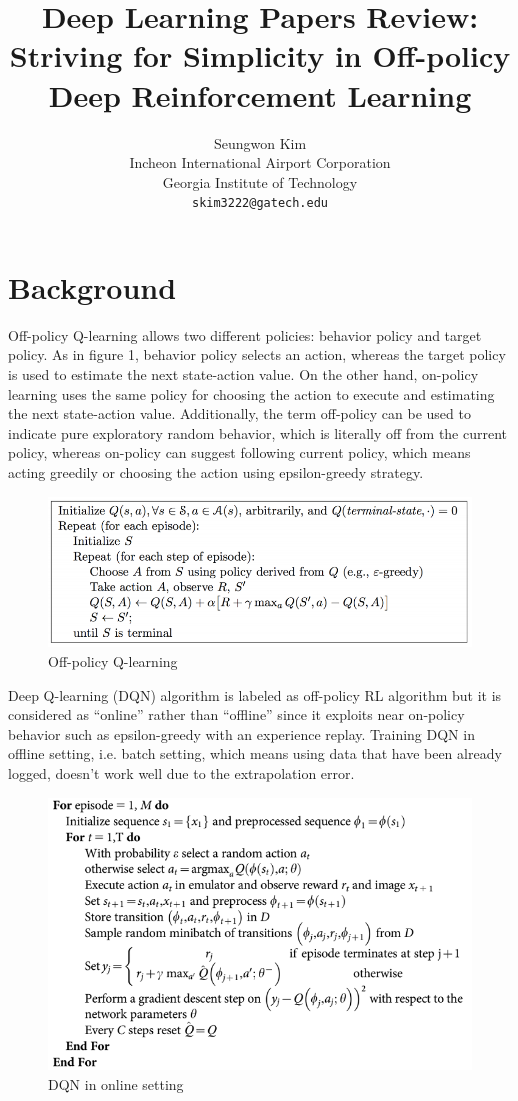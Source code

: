 \documentclass{article}
\title{Deep Learning Papers Review: Striving for Simplicity in Off-policy Deep Reinforcement Learning}
\author{%
  Seungwon Kim\\
  Incheon International Airport Corporation\\
  Georgia Institute of Technology\\
  \texttt{skim3222@gatech.edu} \\
}
\begin{document}
\maketitle

\section{Background}

Off-policy Q-learning allows two different policies: behavior policy and target policy. As in figure 1, behavior policy selects an action, whereas the target policy is used to estimate the next state-action value. On the other hand, on-policy learning uses the same policy for choosing the action to execute and estimating the next state-action value. Additionally, the term off-policy can be used to indicate pure exploratory random behavior, which is literally off from the current policy, whereas on-policy can suggest following current policy, which means acting greedily or choosing the action using epsilon-greedy strategy.

\begin{figure}[H]
  \centering
    \includegraphics[width=0.6\linewidth]{0.png}
  \caption{Off-policy Q-learning}
\end{figure}

Deep Q-learning (DQN) algorithm is labeled as off-policy RL algorithm but it is considered as “online” rather than “offline” since it exploits near on-policy behavior such as epsilon-greedy with an experience replay. Training DQN in offline setting, i.e. batch setting, which means using data that have been already logged, doesn’t work well due to the extrapolation error.

\begin{figure}[H]
  \centering
    \includegraphics[width=0.5\linewidth]{0_1.png}
  \caption{DQN in online setting}
\end{figure}
\end{document}

